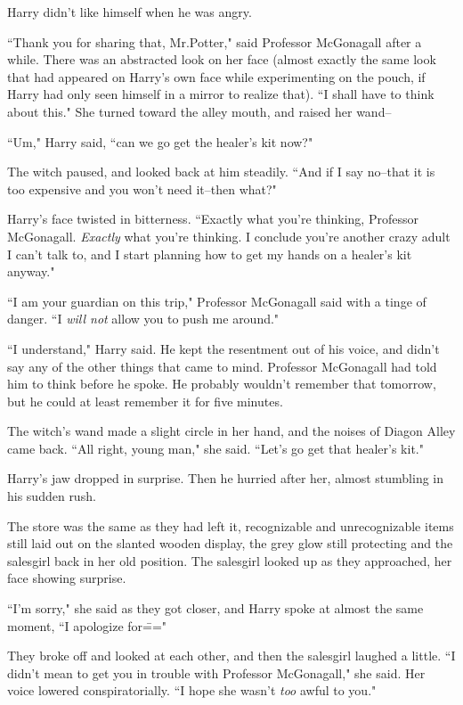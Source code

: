 Harry didn't like himself when he was angry.

``Thank you for sharing that, Mr.\?Potter," said Professor McGonagall after a while. There was an abstracted look on her face (almost exactly the same look that had appeared on Harry's own face while experimenting on the pouch, if Harry had only seen himself in a mirror to realize that). ``I shall have to think about this." She turned toward the alley mouth, and raised her wand\---

``Um," Harry said, ``can we go get the healer's kit now?"

The witch paused, and looked back at him steadily. ``And if I say no\---that it is too expensive and you won't need it\---then what?"

Harry's face twisted in bitterness. ``Exactly what you're thinking, Professor McGonagall. \emph{Exactly} what you're thinking. I conclude you're another crazy adult I can't talk to, and I start planning how to get my hands on a healer's kit anyway."

``I am your guardian on this trip," Professor McGonagall said with a tinge of danger. ``I \emph{will not} allow you to push me around."

``I understand," Harry said. He kept the resentment out of his voice, and didn't say any of the other things that came to mind. Professor McGonagall had told him to think before he spoke. He probably wouldn't remember that tomorrow, but he could at least remember it for five minutes.

The witch's wand made a slight circle in her hand, and the noises of Diagon Alley came back. ``All right, young man," she said. ``Let's go get that healer's kit."

Harry's jaw dropped in surprise. Then he hurried after her, almost stumbling in his sudden rush.

\later

The store was the same as they had left it, recognizable and unrecognizable items still laid out on the slanted wooden display, the grey glow still protecting and the salesgirl back in her old position. The salesgirl looked up as they approached, her face showing surprise.

``I'm sorry," she said as they got closer, and Harry spoke at almost the same moment, ``I apologize for\==="

They broke off and looked at each other, and then the salesgirl laughed a little. ``I didn't mean to get you in trouble with Professor McGonagall," she said. Her voice lowered conspiratorially. ``I hope she wasn't \emph{too} awful to you."

